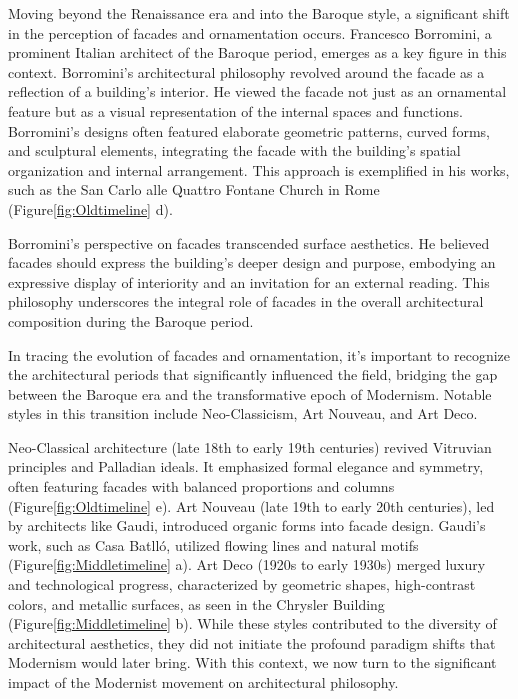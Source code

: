 Moving beyond the Renaissance era and into the Baroque style, a significant shift in the perception of facades and ornamentation occurs.
Francesco Borromini, a prominent Italian architect of the Baroque period, emerges as a key figure in this context.
Borromini's architectural philosophy revolved around the facade as a reflection of a building's interior.
He viewed the facade not just as an ornamental feature but as a visual representation of the internal spaces and functions\cite{Benjamin2006}.
Borromini's designs often featured elaborate geometric patterns, curved forms, and sculptural elements, integrating the facade with the building's spatial organization and internal arrangement.
This approach is exemplified in his works, such as the San Carlo alle Quattro Fontane Church in Rome (Figure\ref{fig:Oldtimeline} d).

Borromini's perspective on facades transcended surface aesthetics.
He believed facades should express the building's deeper design and purpose, embodying an expressive display of interiority and an invitation for an external reading\cite{Biglieri2004}.
This philosophy underscores the integral role of facades in the overall architectural composition during the Baroque period.


In tracing the evolution of facades and ornamentation, it's important to recognize the architectural periods that significantly influenced the field, bridging the gap between the Baroque era and the transformative epoch of Modernism.
Notable styles in this transition include Neo-Classicism, Art Nouveau, and Art Deco.

Neo-Classical architecture (late 18th to early 19th centuries) revived Vitruvian principles and Palladian ideals.
It emphasized formal elegance and symmetry, often featuring facades with balanced proportions and columns (Figure\ref{fig:Oldtimeline} e).
Art Nouveau (late 19th to early 20th centuries), led by architects like Gaudi, introduced organic forms into facade design.
Gaudi's work, such as Casa Batlló, utilized flowing lines and natural motifs\cite{Nasir2022} (Figure\ref{fig:Middletimeline} a).
Art Deco (1920s to early 1930s) merged luxury and technological progress, characterized by geometric shapes, high-contrast colors, and metallic surfaces, as seen in the Chrysler Building\cite{Kotb2014} (Figure\ref{fig:Middletimeline} b).
While these styles contributed to the diversity of architectural aesthetics, they did not initiate the profound paradigm shifts that Modernism would later bring.
With this context, we now turn to the significant impact of the Modernist movement on architectural philosophy.

